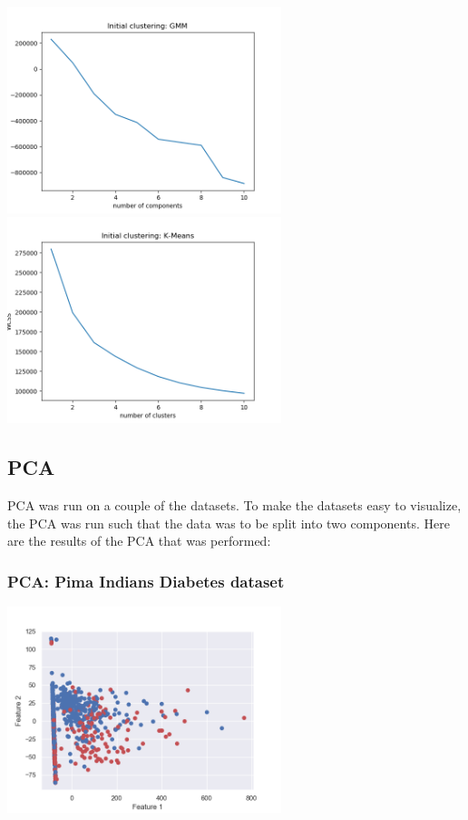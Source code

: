 \documentclass[11pt]{article}
\begin{document}
            \includegraphics[width=8cm]{../mushrooms/clustering1/gmm_init.png}
            \includegraphics[width=8cm]{../mushrooms/clustering1/km_init.png}
            
            \subsection{PCA}

                PCA was run on a couple of the datasets. To make the datasets easy to visualize, the
                PCA was run such that the data was to be split into two components. Here are the
                results of the PCA that was performed:

            \subsubsection{PCA: Pima Indians Diabetes dataset}

            \includegraphics[width=8cm]{../pima/pca/diabetes_pca.png}
\end{document}
